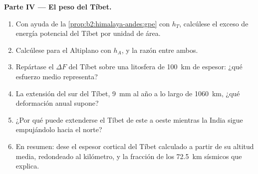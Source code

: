 \begin{problem}
\noindent\textbf{Parte IV --- El peso del Tíbet.}
\begin{enumerate}[resume]
\item Con ayuda de la \cref{prop:b2:himalaya-andes:gpe} con $h_T$, calcúlese el exceso de energía potencial
del Tíbet por unidad de área.
\item Calcúlese para el Altiplano con $h_A$, y la razón entre ambos.
\item Repártase el $\Delta F$ del Tíbet sobre una litosfera de \qty{100}{km} de espesor: ¿qué esfuerzo medio
representa?
\item La extensión del sur del Tíbet, \qty{9}{mm} al año a lo largo de \qty{1060}{km}, ¿qué
deformación anual supone?
\item ¿Por qué puede extenderse el Tíbet de este a oeste mientras la India sigue empujándolo hacia el norte?
\item En resumen: dese el espesor cortical del Tíbet calculado a partir de su altitud media, redondeado
al kilómetro, y la fracción de los \qty{72.5}{km} sísmicos que explica.
\end{enumerate}
\end{problem}

